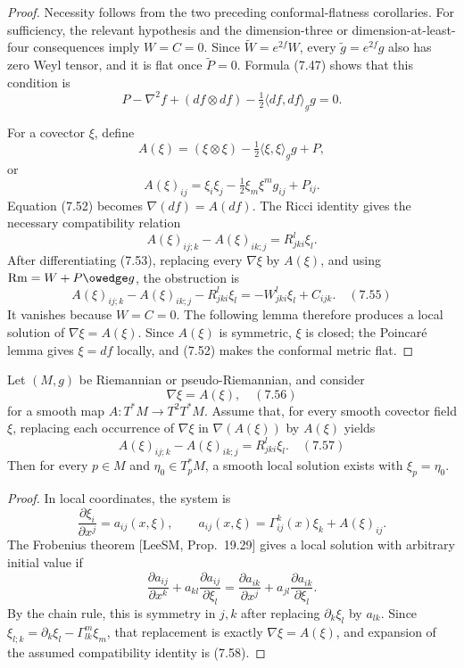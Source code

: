 \begin{proof}
\sketch
Necessity follows from the two preceding conformal-flatness corollaries.  For
sufficiency, the relevant hypothesis and the dimension-three or
dimension-at-least-four consequences imply $W=C=0$.  Since
$\widetilde W=e^{2f}W$, every $\widetilde g=e^{2f}g$ also has zero Weyl tensor,
and it is flat once $\widetilde P=0$.  Formula (7.47) shows that this condition
is
\begin{equation}
P-\nabla^2f+(df\otimes df)
-\tfrac12\langle df,df\rangle_gg=0. \tag{7.52}
\end{equation}

For a covector $\xi$, define
\[
A(\xi)=(\xi\otimes\xi)-\tfrac12\langle\xi,\xi\rangle_gg+P,
\]
or
\begin{equation}
A(\xi)_{ij}=\xi_i\xi_j-\tfrac12\xi_m\xi^mg_{ij}+P_{ij}. \tag{7.53}
\end{equation}
Equation (7.52) becomes $\nabla(df)=A(df)$.  The Ricci identity gives the
necessary compatibility relation
\begin{equation}
A(\xi)_{ij;k}-A(\xi)_{ik;j}=R_{jki}^{l}\xi_l. \tag{7.54}
\end{equation}
After differentiating (7.53), replacing every $\nabla\xi$ by $A(\xi)$, and
using $\mathrm{Rm}=W+P\owedge g$, the obstruction is
\[
A(\xi)_{ij;k}-A(\xi)_{ik;j}-R_{jki}^{l}\xi_l
=-W_{jki}^{l}\xi_l+C_{ijk}. \quad (7.55)
\]
It vanishes because $W=C=0$.  The following lemma therefore produces a local
solution of $\nabla\xi=A(\xi)$.  Since $A(\xi)$ is symmetric, $\xi$ is closed;
the Poincar\'e lemma gives $\xi=df$ locally, and (7.52) makes the conformal
metric flat.
\end{proof}

\begin{lemma}
\label{lem:overdetermined-covector-system}
Let $(M,g)$ be Riemannian or pseudo-Riemannian, and consider
\[
\nabla\xi=A(\xi), \quad (7.56)
\]
for a smooth map $A:T^*M\to T^2T^*M$.  Assume that, for every smooth covector
field $\xi$, replacing each occurrence of $\nabla\xi$ in
$\nabla(A(\xi))$ by $A(\xi)$ yields
\[
A(\xi)_{ij;k}-A(\xi)_{ik;j}=R_{jki}^{l}\xi_l. \quad (7.57)
\]
Then for every $p\in M$ and $\eta_0\in T_p^*M$, a smooth local solution exists
with $\xi_p=\eta_0$.
\end{lemma}

\begin{proof}
\sketch
In local coordinates, the system is
\[
\frac{\partial\xi_i}{\partial x^j}=a_{ij}(x,\xi),
\qquad
a_{ij}(x,\xi)=\Gamma^k_{ij}(x)\xi_k+A(\xi)_{ij}.
\]
The Frobenius theorem [LeeSM, Prop.~19.29] gives a local solution with
arbitrary initial value if
\begin{equation}
\frac{\partial a_{ij}}{\partial x^k}
+a_{kl}\frac{\partial a_{ij}}{\partial\xi_l}
=\frac{\partial a_{ik}}{\partial x^j}
+a_{jl}\frac{\partial a_{ik}}{\partial\xi_l}. \tag{7.58}
\end{equation}
By the chain rule, this is symmetry in $j,k$ after replacing
$\partial_k\xi_l$ by $a_{lk}$.  Since
$\xi_{l;k}=\partial_k\xi_l-\Gamma^m_{lk}\xi_m$, that replacement is exactly
$\nabla\xi=A(\xi)$, and expansion of the assumed compatibility identity is
(7.58).
\end{proof}

